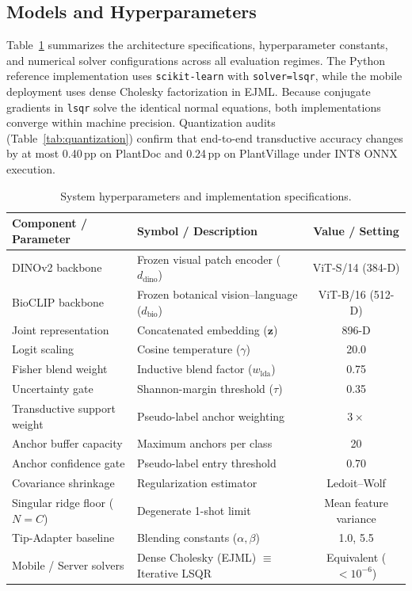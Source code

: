 \documentclass[preprint,12pt]{elsarticle}
\begin{document}
\subsection{Models and Hyperparameters}
Table~\ref{tab:hyperparameters} summarizes the architecture specifications, hyperparameter constants, and numerical solver configurations across all evaluation regimes. The Python reference implementation uses \texttt{scikit-learn} with \texttt{solver=lsqr}, while the mobile deployment uses dense Cholesky factorization in EJML. Because conjugate gradients in \texttt{lsqr} solve the identical normal equations, both implementations converge within machine precision. Quantization audits (Table~\ref{tab:quantization}) confirm that end-to-end transductive accuracy changes by at most 0.40\,pp on PlantDoc and 0.24\,pp on PlantVillage under INT8 ONNX execution.

\begin{table}[htbp]
\caption{System hyperparameters and implementation specifications.}
\label{tab:hyperparameters}
\centering
\footnotesize
\setlength{\tabcolsep}{4pt}
\begin{tabularx}{\columnwidth}{@{}l X c@{}}
\toprule
\textbf{Component / Parameter} & \textbf{Symbol / Description} & \textbf{Value / Setting} \\
\midrule
DINOv2 backbone & Frozen visual patch encoder ($d_{\text{dino}}$) & ViT-S/14 (384-D) \\
BioCLIP backbone & Frozen botanical vision--language ($d_{\text{bio}}$) & ViT-B/16 (512-D) \\
Joint representation & Concatenated embedding ($\mathbf{z}$) & 896-D \\
Logit scaling & Cosine temperature ($\gamma$) & 20.0 \\
Fisher blend weight & Inductive blend factor ($w_{\text{lda}}$) & 0.75 \\
Uncertainty gate & Shannon-margin threshold ($\tau$) & 0.35 \\
Transductive support weight & Pseudo-label anchor weighting & $3\times$ \\
Anchor buffer capacity & Maximum anchors per class & 20 \\
Anchor confidence gate & Pseudo-label entry threshold & 0.70 \\
Covariance shrinkage & Regularization estimator & Ledoit--Wolf \\
Singular ridge floor ($N=C$) & Degenerate 1-shot limit & Mean feature variance \\
Tip-Adapter baseline & Blending constants ($\alpha, \beta$) & 1.0, 5.5 \\
Mobile / Server solvers & Dense Cholesky (EJML) $\equiv$ Iterative LSQR & Equivalent ($<10^{-6}$) \\
\bottomrule
\end{tabularx}
\end{table}
\end{document}
